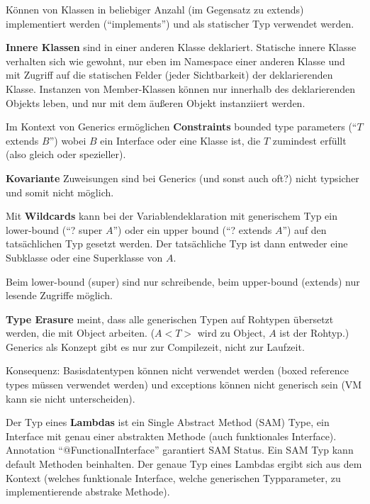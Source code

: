 \documentclass[twocolumn]{article}
\newcommand{\separator}{\vspace{0.5em}\noindent}
\newcommand{\term}[1]{\textbf{#1}}
\begin{document}
Können von Klassen in beliebiger Anzahl (im Gegensatz zu extends) implementiert werden (\enquote{implements}) und als statischer Typ verwendet werden.

\separator
\term{Innere Klassen} sind in einer anderen Klasse deklariert. Statische innere Klasse verhalten sich wie gewohnt, nur eben im Namespace einer anderen Klasse und mit Zugriff auf die statischen Felder (jeder Sichtbarkeit) der deklarierenden Klasse. Instanzen von Member-Klassen können nur innerhalb des deklarierenden Objekts leben, und nur mit dem äußeren Objekt instanziiert werden.

\separator
Im Kontext von Generics ermöglichen \term{Constraints} bounded type parameters (\enquote{$T$ extends $B$}) wobei $B$ ein Interface oder eine Klasse ist, die $T$ zumindest erfüllt (also gleich oder spezieller).

\term{Kovariante} Zuweisungen sind bei Generics (und sonst auch oft?) nicht typsicher und somit nicht möglich.

Mit \term{Wildcards} kann bei der Variablendeklaration mit generischem Typ ein lower-bound (\enquote{? super $A$}) oder ein upper bound (\enquote{? extends $A$}) auf den tatsächlichen Typ gesetzt werden. Der tatsächliche Typ ist dann entweder eine Subklasse oder eine Superklasse von $A$.

Beim lower-bound (super) sind nur schreibende, beim upper-bound (extends) nur lesende Zugriffe möglich.

\term{Type Erasure} meint, dass alle generischen Typen auf Rohtypen übersetzt werden, die mit Object arbeiten. ($A<T>$ wird zu Object, $A$ ist der Rohtyp.) Generics als Konzept gibt es nur zur Compilezeit, nicht zur Laufzeit.

Konsequenz: Basisdatentypen können nicht verwendet werden (boxed reference types müssen verwendet werden) und exceptions können nicht generisch sein (VM kann sie nicht unterscheiden).

Der Typ eines \term{Lambdas} ist ein Single Abstract Method (SAM) Type, ein Interface mit genau einer abstrakten Methode (auch funktionales Interface). Annotation \enquote{@FunctionalInterface} garantiert SAM Status. Ein SAM Typ kann default Methoden beinhalten. Der genaue Typ eines Lambdas ergibt sich aus dem Kontext (welches funktionale Interface, welche generischen Typparameter, zu implementierende abstrake Methode).
\end{document}
